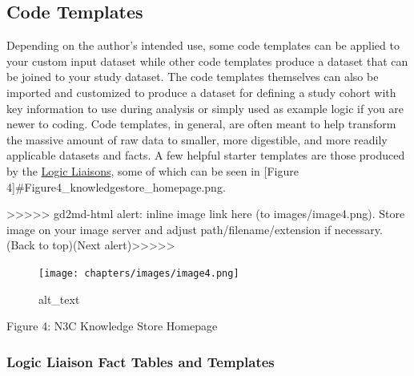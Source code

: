 \documentclass[
  letterpaper,
  DIV=11,
  numbers=noendperiod]{scrreprt}
\begin{document}
\hypertarget{code-templates}{%
\subsection{Code Templates}\label{code-templates}}

Depending on the author's intended use, some code templates can be
applied to your custom input dataset while other code templates produce
a dataset that can be joined to your study dataset. The code templates
themselves can also be imported and customized to produce a dataset for
defining a study cohort with key information to use during analysis or
simply used as example logic if you are newer to coding. Code templates,
in general, are often meant to help transform the massive amount of raw
data to smaller, more digestible, and more readily applicable datasets
and facts. A few helpful starter templates are those produced by the
\href{https://covid.cd2h.org/liaisons}{Logic Liaisons}, some of which
can be seen in {[}Figure 4{]}\#Figure4\_knowledgestore\_homepage.png.

{\textgreater\textgreater\textgreater\textgreater\textgreater{}
gd2md-html alert: inline image link here (to images/image4.png). Store
image on your image server and adjust path/filename/extension if
necessary. }(Back to top)(Next
alert){\textgreater\textgreater\textgreater\textgreater\textgreater{} }

\begin{figure}

{\centering \texttt{[image: chapters/images/image4.png]}

}

\caption{alt\_text}

\end{figure}

Figure 4: N3C Knowledge Store Homepage

\hypertarget{logic-liaison-fact-tables-and-templates}{%
\subsubsection{Logic Liaison Fact Tables and
Templates}\label{logic-liaison-fact-tables-and-templates}}
\end{document}
